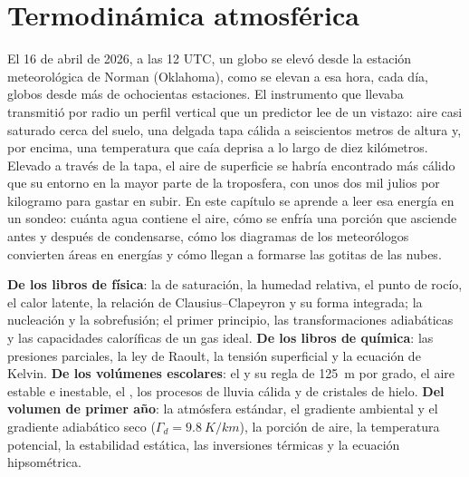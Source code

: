 \chapter{Termodinámica atmosférica}\label{ch:b2:atmospheric-thermodynamics}

El 16 de abril de 2026, a las 12 UTC, un globo se elevó desde la estación meteorológica de Norman (Oklahoma), como
se elevan a esa hora, cada día, globos desde más de ochocientas estaciones. El instrumento que
llevaba transmitió por radio un perfil vertical que un predictor lee de un vistazo: aire casi saturado
cerca del suelo, una delgada tapa cálida a seiscientos metros de altura y, por encima, una temperatura que caía
deprisa a lo largo de diez kilómetros. Elevado a través de la tapa, el aire de superficie se habría encontrado
más cálido que su entorno en la mayor parte de la troposfera, con unos dos mil julios por
kilogramo para gastar en subir. En este capítulo se aprende a leer esa energía en un sondeo: cuánta
agua contiene el aire, cómo se enfría una porción que asciende antes y después de condensarse, cómo los diagramas de
los meteorólogos convierten áreas en energías y cómo llegan a formarse las gotitas de las nubes.

\begin{recall}
\textbf{De los libros de física}: la  de saturación, la humedad relativa, el punto de rocío,
el calor latente, la relación de Clausius--Clapeyron y su forma integrada; la nucleación y la
sobrefusión; el primer principio, las transformaciones adiabáticas y las capacidades caloríficas de un gas ideal.
\textbf{De los libros de química}: las presiones parciales, la ley de Raoult, la tensión superficial y la ecuación
de Kelvin. \textbf{De los volúmenes escolares}: el  y su regla de
\qty{125}{m} por grado, el aire estable e inestable, el , los procesos de lluvia cálida
y de cristales de hielo. \textbf{Del volumen de primer año}: la atmósfera estándar, el gradiente ambiental
y el gradiente adiabático seco ($\Gamma_d = \qty{9.8}{K/km}$), la porción de aire, la temperatura
potencial, la estabilidad estática, las inversiones térmicas y la ecuación hipsométrica.
\end{recall}

